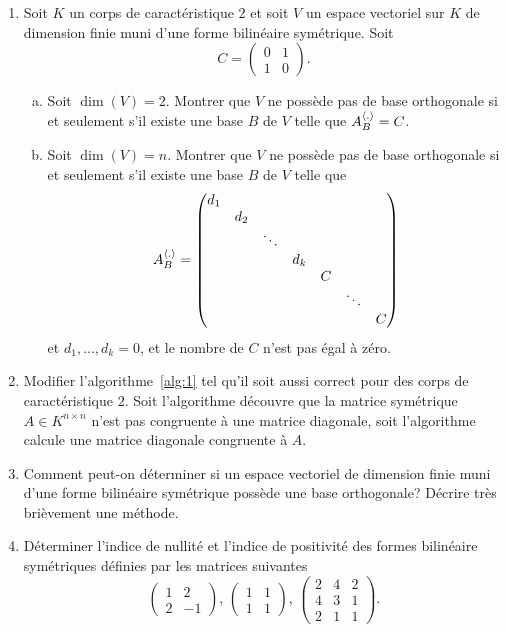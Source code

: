 \begin{enumerate}
\item Soit $K$ un corps de caractéristique $2$ et soit $V$ un espace vectoriel sur $K$ de dimension finie muni d'une forme bilinéaire symétrique. Soit 
  \begin{displaymath}
    C =
    \begin{pmatrix}
      0 & 1 \\
      1 & 0 
    \end{pmatrix}.
  \end{displaymath}
  \begin{enumerate}[a)]
  \item Soit $\dim(V) = 2$. Montrer que $V$ ne possède pas de base orthogonale si et seulement s'il existe une base $B$ de $V$ telle que $A_B^{\langle {.} \rangle} = C$. 
  \item Soit $\dim(V) = n$. Montrer que $V$ ne possède pas de base orthogonale si et seulement s'il existe une base $B$ de $V$ telle que 
    \begin{displaymath} A_B^{\langle {.} \rangle} = 
      \begin{pmatrix}
        d_1 \\
        & d_2 \\
        & & \ddots \\
        & &   & d_k \\
        & &   &  & C \\
        & &   &  & & \ddots \\
        & &   &  & & & C \\
      \end{pmatrix}
    \end{displaymath}
    et $d_1,\dots,d_k = 0$, et le nombre de $C$ n'est pas égal à zéro. 
  \end{enumerate}
\item Modifier l'algorithme~\ref{alg:1} tel qu'il soit aussi correct pour des corps de caractéristique $2$.  Soit l'algorithme découvre que la matrice symétrique $A \in K^{n \times n}$ n'est pas congruente à une matrice diagonale, soit l'algorithme calcule une matrice diagonale congruente à $A$. 
\item Comment peut-on déterminer si un espace vectoriel de dimension finie muni d'une forme bilinéaire symétrique  possède une base orthogonale? Décrire très brièvement une méthode. 
\item Déterminer l'indice de nullité et l'indice de positivité des 
formes bilinéaire symétriques 
 définies par les matrices suivantes
  \begin{displaymath}
    \begin{pmatrix}
      1 & 2 \\
      2 & -1
    \end{pmatrix}
    , \,
    \begin{pmatrix}
      1 & 1 \\
      1 & 1
    \end{pmatrix}, \, 
    \begin{pmatrix}
      2 & 4 & 2 \\
      4 & 3 &  1 \\ 
      2 & 1 &1
    \end{pmatrix}. 
  \end{displaymath}
 

\end{enumerate}
